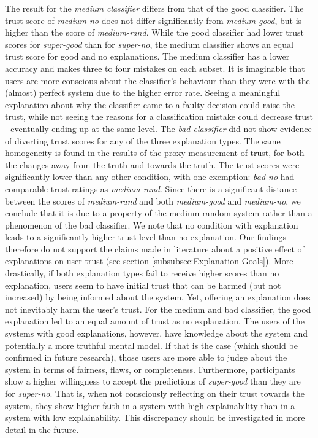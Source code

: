 The result for the \textit{medium classifier} differs from that of the good classifier. The trust score of \textit{medium-no} does not differ significantly from \textit{medium-good}, but is higher than the score of \textit{medium-rand}. While the good classifier had lower trust scores for \textit{super-good} than for \textit{super-no}, the medium classifier shows an equal trust score for good and no explanations. The medium classifier has a lower accuracy and makes three to four mistakes on each subset. It is imaginable that users are more conscious about the classifier's behaviour than they were with the (almost) perfect system due to the higher error rate. Seeing a meaningful explanation about why the classifier came to a faulty decision could raise the trust, while not seeing the reasons for a classification mistake could decrease trust - eventually ending up at the same level.\newline
The \textit{bad classifier} did not show evidence of diverting trust scores for any of the three explanation types. The same homogeneity is found in the results of the proxy measurement of trust, for both the changes away from the truth and towards the truth. The trust scores were significantly lower than any other condition, with one exemption: \textit{bad-no} had comparable trust ratings as \textit{medium-rand}. Since there is a significant distance between the scores of \textit{medium-rand} and both \textit{medium-good} and \textit{medium-no}, we conclude that it is due to a property of the medium-random system rather than a phenomenon of the bad classifier.\newline
We note that no condition with explanation leads to a significantly higher trust level than no explanation. Our findings therefore do not support the claims made in literature about a positive effect of explanations on user trust (see section \ref{subsubsec:Explanation Goals}). More drastically, if both explanation types fail to receive higher scores than no explanation, users seem to have initial trust that can be harmed (but not increased) by being informed about the system. Yet, offering an explanation does not inevitably harm the user's trust. For the medium and bad classifier, the good explanation led to an equal amount of trust as no explanation. The users of the systems with good explanations, however, have knowledge about the system and potentially a more truthful mental model. If that is the case (which should be confirmed in future research), those users are more able to judge about the system in terms of fairness, flaws, or completeness. Furthermore, participants show a higher willingness to accept the predictions of \textit{super-good} than they are for \textit{super-no}. That is, when not consciously reflecting on their trust towards the system, they show higher faith in a system with high explainability than in a system with low explainability. This discrepancy should be investigated in more detail in the future.\newline
